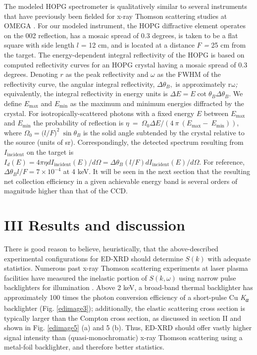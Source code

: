 The modeled HOPG spectrometer is qualitatively similar to several
instruments that have previously been fielded for x-ray Thomson
scattering studies at OMEGA
 \cite{YOO2012GRAPHENE, VISCO2012MEASUREMENT}.
For our modeled instrument, the HOPG diffractive element operates on the
002 reflection, has a mosaic spread of 0.3 degrees, is taken to be a
flat square with side length \(l\) = 12 cm, and is located at a distance
\(F\) \emph{=} 25 cm from the target. The energy-dependent integral
reflectivity of the HOPG is based on computed reflectivity curves
 \cite{FREUND1996X}
for an HOPG crystal having a mosaic spread of 0.3 degrees. Denoting
\(r\) as the peak reflectivity and \(\omega\) as the FWHM of the
reflectivity curve, the angular integral reflectivity,
\(\Delta\theta_{B},\) is approximately \(\text{rω}\)\emph{;}
equivalently, the integral reflectivity in energy units is
\(\Delta E = E\cot{\theta_{B}\Delta\theta_{B}}\). We define \(E_{\max}\)
and \(E_{\min}\) as the maximum and minimum energies diffracted by the
crystal. For isotropically-scattered photons with a fixed energy \(E\)
between \(E_{\max}\) and \(E_{\min}\) the probability of reflection is
\(\eta\  = \ \Omega_{0}\Delta E/(4\ \pi\ \left( E_{\max} - \ E_{\min} \right))\),
where \(\Omega_{0} = ({l/F)}^{2}\ \sin\theta_{B}\) is the solid angle
subtended by the crystal relative to the source (units of sr).
Correspondingly, the detected spectrum resulting from
\(I_{\text{incident}}\) on the target is
\(I_{d}\left( E \right) = 4\pi\eta dI_{\text{incident}}\left( E \right)/d\Omega = \Delta\theta_{B}(l/F)dI_{\text{incident}}\left( E \right)/d\Omega\).
For reference, \(\Delta\theta_{B}l/F = 7 \times 10^{- 4}\) at 4 keV. It
will be seen in the next section that the resulting net collection
efficiency in a given achievable energy band is several orders of
magnitude higher than that of the CCD.

\section{III Results and
discussion}\label{iii-results-and-discussion}

There is good reason to believe, heuristically, that the above-described
experimental configurations for ED-XRD should determine
\(S\left( k \right)\) with adequate statistics. Numerous past x-ray
Thomson scattering experiments at laser plasma facilities have measured
the inelastic portion of \(S\left( k,\omega \right)\) using narrow pulse
backlighters for illumination
 \cite{glenzer2009x, lee2009x, FORTMANN2012MEASUREMENT, TOMMASINI2010DEVELOPMENT, KRITCHER2008ULTRAFAST, glenzer2003demonstration, GREGORI2006MEASUREMENT}.
Above 2 keV, a broad-band thermal backlighter has approximately 100
times the photon conversion efficiency of a short-pulse Cu
\emph{K\textsubscript{α}} backlighter (Fig. \ref{edimage3}); additionally, the
elastic scattering cross section is typically larger than the Compton
cross section, as discussed in section II and shown in Fig. \ref{edimage5} (a) and 5
(b). Thus, ED-XRD should offer vastly higher signal intensity than
(quasi-monochromatic) x-ray Thomson scattering using a metal-foil
backlighter, and therefore better statistics.

